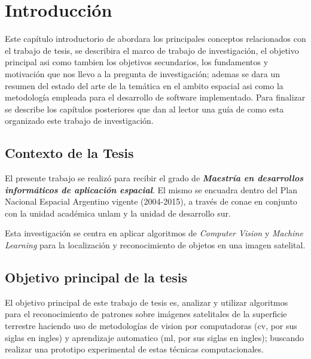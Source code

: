 \chapter{Introducción}\label{chap:introduccion}

Este capítulo introductorio de abordara los principales conceptos relacionados con el trabajo de tesis, se describira el marco de trabajo de investigación, el objetivo principal asi como tambien los objetivos secundarios, los fundamentos y motivación que nos llevo a la pregunta de investigación; ademas se dara un resumen del estado del arte de la temática en el ambito espacial asi como la metodología empleada para el desarrollo de software implementado. Para finalizar se describe los capítulos posteriores que dan al lector una guía de como esta organizado este trabajo de investigación.


\section{Contexto de la Tesis}\label{sec:contexto}
El presente trabajo se realizó para recibir el grado de\textbf{ \textit{Maestría en desarrollos informáticos de aplicación espacial}}. El mismo se encuadra dentro del Plan Nacional Espacial Argentino vigente (2004-2015), a través de \ac{conae} en conjunto con la unidad académica \ac{unlam} y la unidad de desarrollo \ac{sur}.

Esta investigación se centra en aplicar  algoritmos de \textit{Computer Vision}  y \textit{Machine Learning} para la localización y reconocimiento de objetos en una imagen satelital.



\section{Objetivo principal de la tesis}\label{sec:ObjGral}

El objetivo principal de este trabajo de tesis es, analizar y utilizar algoritmos para el  reconocimiento de patrones sobre imágenes satelitales de la superficie terrestre haciendo uso de metodologías de vision por computadoras (\ac{cv}, por sus siglas en ingles) y aprendizaje automatico (\ac{ml}, por sus siglas en ingles); buscando realizar una prototipo experimental de estas técnicas computacionales.


